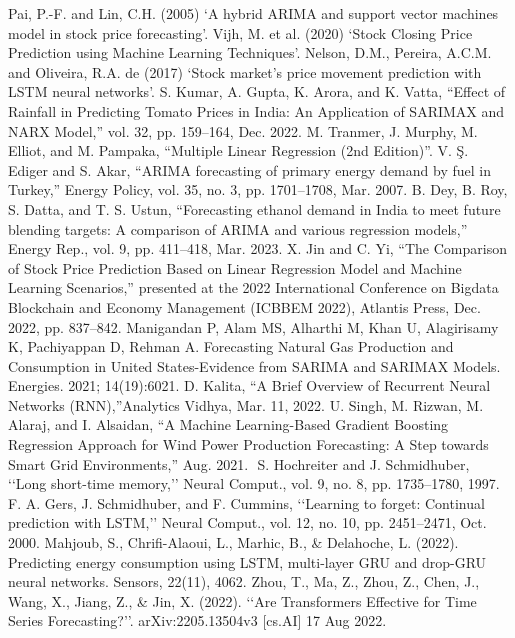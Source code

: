 \documentclass{ieeeojies}
\begin{document}
\begin{thebibliography}{00}
     Pai, P.-F. and Lin, C.H. (2005) ‘A hybrid ARIMA and support vector machines model in stock price forecasting’.
     Vijh, M. et al. (2020) ‘Stock Closing Price Prediction using Machine Learning Techniques’.
    Nelson, D.M., Pereira, A.C.M. and Oliveira, R.A. de (2017) ‘Stock market’s price movement prediction with LSTM neural networks’.
    S. Kumar, A. Gupta, K. Arora, and K. Vatta, “Effect of Rainfall in Predicting Tomato Prices in India: An Application of SARIMAX and NARX Model,” vol. 32, pp. 159–164, Dec. 2022.
    M. Tranmer, J. Murphy, M. Elliot, and M. Pampaka, “Multiple Linear Regression (2nd Edition)”.
    V. Ş. Ediger and S. Akar, “ARIMA forecasting of primary energy demand by fuel in Turkey,” Energy Policy, vol. 35, no. 3, pp. 1701–1708, Mar. 2007.
    B. Dey, B. Roy, S. Datta, and T. S. Ustun, “Forecasting ethanol demand in India to meet future blending targets: A comparison of ARIMA and various regression models,” Energy Rep., vol. 9, pp. 411–418, Mar. 2023.
    X. Jin and C. Yi, “The Comparison of Stock Price Prediction Based on Linear Regression Model and Machine Learning Scenarios,” presented at the 2022 International Conference on Bigdata Blockchain and Economy Management (ICBBEM 2022), Atlantis Press, Dec. 2022, pp. 837–842.
    Manigandan P, Alam MS, Alharthi M, Khan U, Alagirisamy K, Pachiyappan D, Rehman A. Forecasting Natural Gas Production and Consumption in United States-Evidence from SARIMA and SARIMAX Models. Energies. 2021; 14(19):6021.
    D. Kalita, “A Brief Overview of Recurrent Neural Networks (RNN),”Analytics Vidhya, Mar. 11, 2022.
    U. Singh, M. Rizwan, M. Alaraj, and I. Alsaidan, “A Machine Learning-Based Gradient Boosting Regression Approach for Wind Power Production Forecasting: A Step towards Smart Grid Environments,” Aug. 2021.
    ‌ S. Hochreiter and J. Schmidhuber, ‘‘Long short-time memory,’’ Neural Comput., vol. 9, no. 8, pp. 1735–1780, 1997.
    F. A. Gers, J. Schmidhuber, and F. Cummins, ‘‘Learning to forget:
    Continual prediction with LSTM,’’ Neural Comput., vol. 12, no. 10, pp. 2451–2471, Oct. 2000.
    Mahjoub, S., Chrifi-Alaoui, L., Marhic, B., \& Delahoche, L. (2022). Predicting energy consumption using LSTM, multi-layer GRU and drop-GRU neural networks. Sensors, 22(11), 4062.
    Zhou, T., Ma, Z., Zhou, Z., Chen, J., Wang, X., Jiang, Z., \& Jin, X. (2022).
    ‘‘Are Transformers Effective for Time Series Forecasting?’’. arXiv:2205.13504v3 [cs.AI] 17 Aug 2022.

\end{thebibliography}
\EOD
\end{document}
